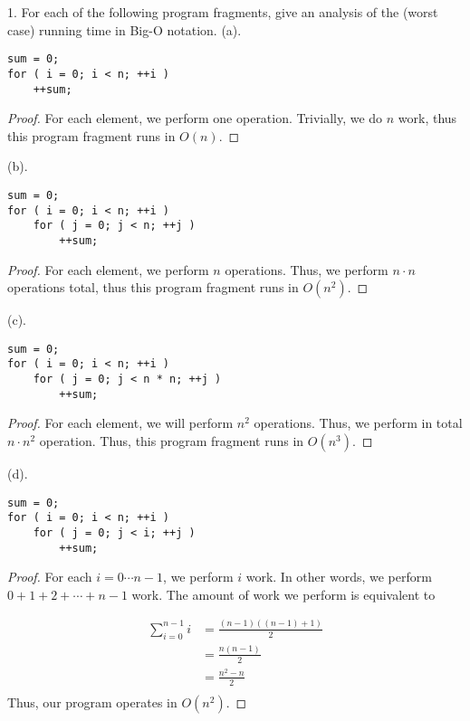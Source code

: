 \documentclass{article}
\begin{document}
1. For each of the following program fragments, give an analysis of the (worst case) running time in
Big-O notation.
\vspace{2mm}
(a).
\begin{verbatim}
sum = 0;
for ( i = 0; i < n; ++i )
    ++sum;
\end{verbatim}

\begin{proof}
For each element, we perform one operation. Trivially, we do $n$ work, thus this program fragment runs in $O(n)$. \qedhere
\end{proof}


(b).
\begin{verbatim}
sum = 0;
for ( i = 0; i < n; ++i )
    for ( j = 0; j < n; ++j )
        ++sum;
\end{verbatim}

\begin{proof}
For each element, we perform $n$ operations. Thus, we perform $n \cdot n$ operations total, thus this program fragment runs in $O(n^{2})$. \qedhere
\end{proof}

(c).
\begin{verbatim}
sum = 0;
for ( i = 0; i < n; ++i )
    for ( j = 0; j < n * n; ++j )
        ++sum;
\end{verbatim}

\begin{proof}
For each element, we will perform $n^{2}$ operations. Thus, we perform in total $n \cdot n^{2}$ operation. Thus, this program fragment runs in $O(n^{3})$.
\end{proof}

(d). 
\begin{verbatim}
sum = 0;
for ( i = 0; i < n; ++i )
    for ( j = 0; j < i; ++j )
        ++sum;
\end{verbatim}

\begin{proof}

For each $i = 0\cdots n-1$, we perform $i$ work. In other words, we perform $0 + 1 + 2 + \cdots + n-1$ work. The amount of work we perform is equivalent to

\begin{align*}
\sum_{i = 0}^{n-1} i &= \frac{(n-1)((n-1)+1)}{2}\\
&=\frac{n(n-1)}{2}\\
&=\frac{n^{2}-n}{2}\\
\end{align*}
Thus, our program operates in $O(n^{2})$.
\end{proof}
\end{document}
